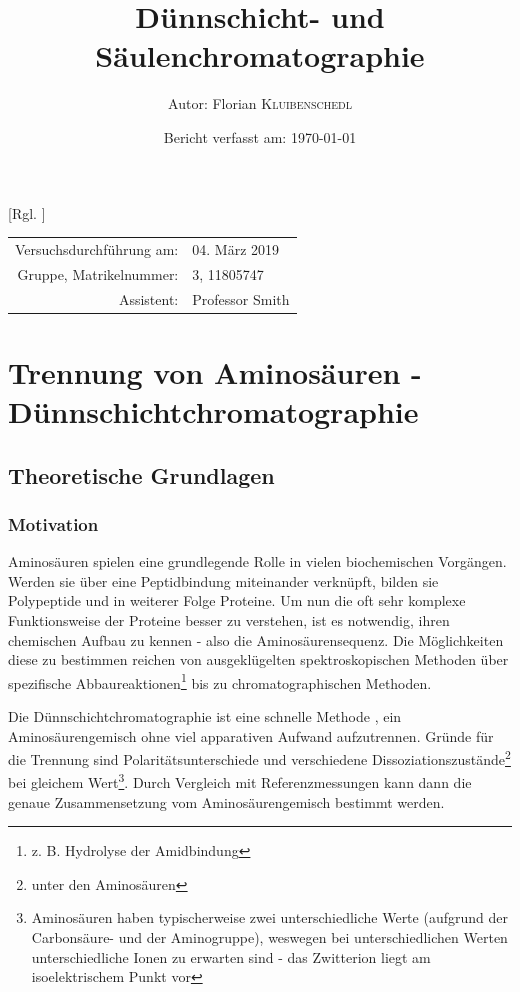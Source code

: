 \documentclass{article}
\title{Dünnschicht- und Säulenchromatographie} %
\author{Autor: Florian \textsc{Kluibenschedl}} %
\date{Bericht verfasst am: \today} %
\begin{document}
  [Rgl. ]{}{}
  
  \maketitle %
  
  \begin{center}
    \begin{tabular}{r l}
      Versuchsdurchführung am: & 04. März 2019\\ %
      Gruppe, Matrikelnummer: & 3, 11805747 \\
      Assistent: & Professor Smith %
    \end{tabular}
  \end{center}


  \begin{abstract}
    
  \end{abstract}
  
  \section{Trennung von Aminosäuren - Dünnschichtchromatographie}
  
    \subsection{Theoretische Grundlagen}
  
      \subsubsection{Motivation} \label{sec:Motivation}
        
        Aminosäuren spielen eine grundlegende Rolle in vielen biochemischen Vorgängen. Werden sie über eine Peptidbindung miteinander verknüpft, bilden sie Polypeptide und in weiterer Folge Proteine. Um nun die oft sehr komplexe Funktionsweise der Proteine besser zu verstehen, ist es notwendig, ihren chemischen Aufbau zu kennen - also die Aminosäurensequenz. Die Möglichkeiten diese zu bestimmen reichen von ausgeklügelten spektroskopischen Methoden über spezifische Abbaureaktionen\footnote{z. B. Hydrolyse der Amidbindung} bis zu chromatographischen Methoden. 
        
        Die Dünnschichtchromatographie ist eine schnelle Methode \cite[S. 148]{TaschenatlasAnallytik}, ein Aminosäurengemisch ohne viel apparativen Aufwand aufzutrennen. Gründe für die Trennung sind Polaritätsunterschiede und verschiedene Dissoziationszustände\footnote{unter den Aminosäuren} bei gleichem \pH Wert\footnote{Aminosäuren haben typischerweise zwei unterschiedliche \pKa Werte (aufgrund der Carbonsäure- und der Aminogruppe), weswegen bei unterschiedlichen \pH Werten unterschiedliche Ionen zu erwarten sind - das Zwitterion liegt am isoelektrischem Punkt vor}. Durch Vergleich mit Referenzmessungen kann dann die genaue Zusammensetzung vom Aminosäurengemisch bestimmt werden.
\end{document}
